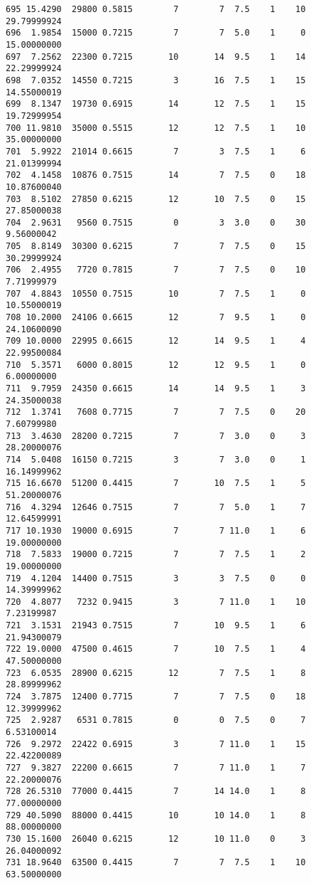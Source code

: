\documentclass[
  letterpaper,
  DIV=11,
  numbers=noendperiod]{scrreprt}
\begin{document}
\begin{verbatim}
695 15.4290  29800 0.5815        7        7  7.5    1    10 29.79999924
696  1.9854  15000 0.7215        7        7  5.0    1     0 15.00000000
697  7.2562  22300 0.7215       10       14  9.5    1    14 22.29999924
698  7.0352  14550 0.7215        3       16  7.5    1    15 14.55000019
699  8.1347  19730 0.6915       14       12  7.5    1    15 19.72999954
700 11.9810  35000 0.5515       12       12  7.5    1    10 35.00000000
701  5.9922  21014 0.6615        7        3  7.5    1     6 21.01399994
702  4.1458  10876 0.7515       14        7  7.5    0    18 10.87600040
703  8.5102  27850 0.6215       12       10  7.5    0    15 27.85000038
704  2.9631   9560 0.7515        0        3  3.0    0    30  9.56000042
705  8.8149  30300 0.6215        7        7  7.5    0    15 30.29999924
706  2.4955   7720 0.7815        7        7  7.5    0    10  7.71999979
707  4.8843  10550 0.7515       10        7  7.5    1     0 10.55000019
708 10.2000  24106 0.6615       12        7  9.5    1     0 24.10600090
709 10.0000  22995 0.6615       12       14  9.5    1     4 22.99500084
710  5.3571   6000 0.8015       12       12  9.5    1     0  6.00000000
711  9.7959  24350 0.6615       14       14  9.5    1     3 24.35000038
712  1.3741   7608 0.7715        7        7  7.5    0    20  7.60799980
713  3.4630  28200 0.7215        7        7  3.0    0     3 28.20000076
714  5.0408  16150 0.7215        3        7  3.0    0     1 16.14999962
715 16.6670  51200 0.4415        7       10  7.5    1     5 51.20000076
716  4.3294  12646 0.7515        7        7  5.0    1     7 12.64599991
717 10.1930  19000 0.6915        7        7 11.0    1     6 19.00000000
718  7.5833  19000 0.7215        7        7  7.5    1     2 19.00000000
719  4.1204  14400 0.7515        3        3  7.5    0     0 14.39999962
720  4.8077   7232 0.9415        3        7 11.0    1    10  7.23199987
721  3.1531  21943 0.7515        7       10  9.5    1     6 21.94300079
722 19.0000  47500 0.4615        7       10  7.5    1     4 47.50000000
723  6.0535  28900 0.6215       12        7  7.5    1     8 28.89999962
724  3.7875  12400 0.7715        7        7  7.5    0    18 12.39999962
725  2.9287   6531 0.7815        0        0  7.5    0     7  6.53100014
726  9.2972  22422 0.6915        3        7 11.0    1    15 22.42200089
727  9.3827  22200 0.6615        7        7 11.0    1     7 22.20000076
728 26.5310  77000 0.4415        7       14 14.0    1     8 77.00000000
729 40.5090  88000 0.4415       10       10 14.0    1     8 88.00000000
730 15.1600  26040 0.6215       12       10 11.0    0     3 26.04000092
731 18.9640  63500 0.4415        7        7  7.5    1    10 63.50000000

\end{verbatim}
\end{document}
